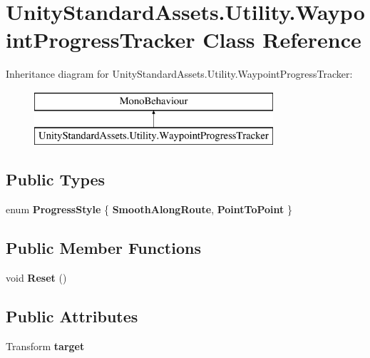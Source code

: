 \hypertarget{class_unity_standard_assets_1_1_utility_1_1_waypoint_progress_tracker}{}\section{Unity\+Standard\+Assets.\+Utility.\+Waypoint\+Progress\+Tracker Class Reference}
\label{class_unity_standard_assets_1_1_utility_1_1_waypoint_progress_tracker}
Inheritance diagram for Unity\+Standard\+Assets.\+Utility.\+Waypoint\+Progress\+Tracker\+:\begin{figure}[H]
\begin{center}
\leavevmode
\includegraphics[height=2.000000cm]{class_unity_standard_assets_1_1_utility_1_1_waypoint_progress_tracker}
\end{center}
\end{figure}
\subsection*{Public Types}
\begin{DoxyCompactItemize}
\item 
\mbox{\label{class_unity_standard_assets_1_1_utility_1_1_waypoint_progress_tracker_ab40f5f8ef7056c806da2080c360bca96}} 
enum {\bfseries Progress\+Style} \{ {\bfseries Smooth\+Along\+Route}, 
{\bfseries Point\+To\+Point}
 \}
\end{DoxyCompactItemize}
\subsection*{Public Member Functions}
\begin{DoxyCompactItemize}
\item 
\mbox{\label{class_unity_standard_assets_1_1_utility_1_1_waypoint_progress_tracker_acb8d4867869050d7453fa0e51fee3547}} 
void {\bfseries Reset} ()
\end{DoxyCompactItemize}
\subsection*{Public Attributes}
\begin{DoxyCompactItemize}
\item 
\mbox{\label{class_unity_standard_assets_1_1_utility_1_1_waypoint_progress_tracker_aba34da851e821dd889429b06aaca0c3a}} 
Transform {\bfseries target}
\end{DoxyCompactItemize}
